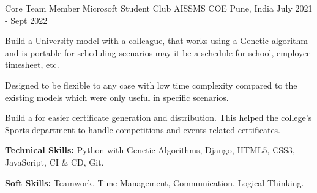 \begin{cventries}
  \cventry
    {Core Team Member Microsoft Student Club} %
    {AISSMS COE} %
    {Pune, India} %
    {July 2021 - Sept 2022} %
    {
      \begin{cvitems} %
        \item {Build a University  model with a colleague, that works using a Genetic algorithm and is portable for scheduling scenarios may it be a schedule for school, employee timesheet, etc.}
        \item {Designed to be flexible to any case with low time complexity compared to the existing models which were only useful in specific scenarios.}
        \item {Build a  for easier certificate generation and distribution. This helped the college's Sports department to handle competitions and events related certificates.}
        \item {\textbf{Technical Skills:} Python with Genetic Algorithms, Django, HTML5, CSS3, JavaScript, CI \& CD, Git.}
        \item {\textbf{Soft Skills:} Teamwork, Time Management, Communication, Logical Thinking.}
      \end{cvitems}
    }

\end{cventries}

